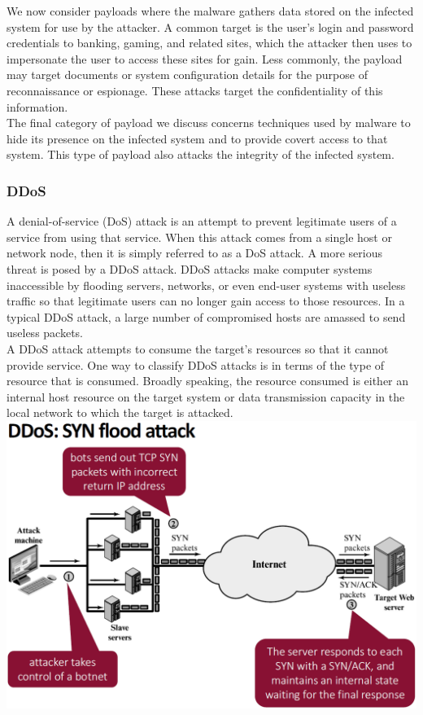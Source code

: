 \documentclass[12pt]{article}
\begin{document}
 We now consider payloads where the malware gathers data stored on the infected system for use by the attacker. A common target is the user’s login and password credentials to banking, gaming, and related sites, which the attacker then uses to impersonate the user to access these sites for gain. Less commonly, the payload may target documents or system configuration details for the purpose of reconnaissance or espionage. These attacks target the confidentiality of this information.\\
 The final category of payload we discuss concerns techniques used by malware to hide its presence on the infected system and to provide covert access to that system. This type of payload also attacks the integrity of the infected system.
 \subsubsection{DDoS}
 A denial-of-service (DoS) attack is an attempt to prevent legitimate users of a service from using that service. When this attack comes from a single host or network node, then it is simply referred to as a DoS attack. A more serious threat is posed by a DDoS attack. DDoS attacks make computer systems inaccessible by flooding servers, networks, or even end-user systems with useless traffic so that legitimate users can no longer gain access to those resources. In a typical DDoS attack, a large number of compromised hosts are amassed to send useless packets.\\
 A DDoS attack attempts to consume the target’s resources so that it cannot provide service. One way to classify DDoS attacks is in terms of the type of resource that is consumed. Broadly speaking, the resource consumed is either an internal host resource on the target system or data transmission capacity in the local network to which the target is attacked.\\
 \includegraphics[width=0.9\linewidth]{./slides/L8P3DDOSSYN.PNG}\\
\end{document}
